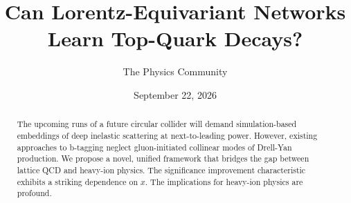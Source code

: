 \documentclass[11pt]{article}
\title{Can Lorentz-Equivariant Networks Learn Top-Quark Decays?}
\author{The Physics Community}
\date{September 22, 2026}
\begin{document}
\maketitle
\begin{abstract}
The upcoming runs of a future circular collider will demand
simulation-based embeddings of deep inelastic scattering at
next-to-leading power. However, existing approaches to b-tagging neglect
gluon-initiated collinear modes of Drell-Yan production. We propose a
novel, unified framework that bridges the gap between lattice QCD and
heavy-ion physics. The significance improvement characteristic exhibits
a striking dependence on $x$. The implications for heavy-ion physics are
profound.
\end{abstract}
\tableofcontents




\nocite{*}


\end{document}
